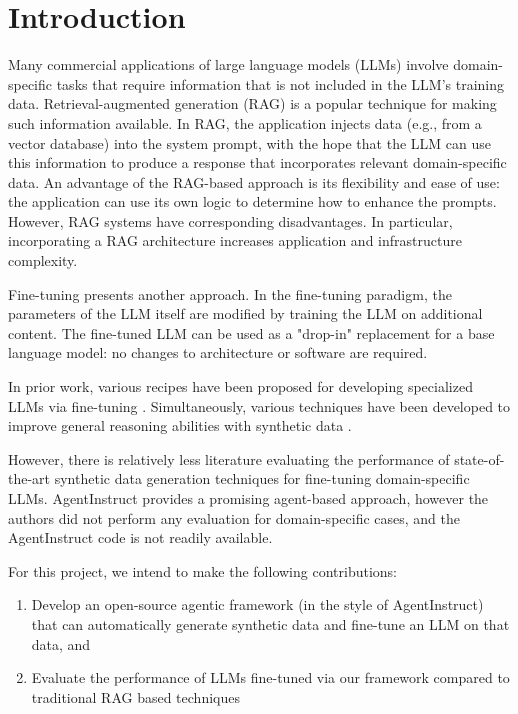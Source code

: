 \section{Introduction}
Many commercial applications of large language models (LLMs) involve
domain-specific tasks that require information that is not included in the LLM’s
training data. Retrieval-augmented generation (RAG)
\citep{lewis_retrieval-augmented_2020} is a popular technique for making such
information available. In RAG, the application injects data (e.g., from a
vector database) into the system prompt, with the hope that the LLM can use this
information to produce a response that incorporates relevant domain-specific
data. An advantage of the RAG-based approach is its flexibility and ease of use:
the application can use its own logic to determine how to enhance the prompts.
However, RAG systems have corresponding disadvantages. In particular,
incorporating a RAG architecture increases application and infrastructure
complexity.

Fine-tuning presents another approach. In the fine-tuning paradigm, the parameters of the LLM itself are modified by training the LLM on additional content. The fine-tuned LLM can be used as a "drop-in" replacement for a base language model: no changes to architecture or software are required.

In prior work, various recipes have been proposed for developing specialized LLMs via fine-tuning \citep{balaguer_rag_2024,yang_fingpt_2023,wu_pmc-llama_2023}. Simultaneously, various techniques have been developed to improve general reasoning abilities with synthetic data \citep{shao_synthetic_2023,wang_self-instruct_2023,mitra_agentinstruct_2024}.

However, there is relatively less literature evaluating the performance of
state-of-the-art synthetic data generation techniques for fine-tuning
domain-specific LLMs. AgentInstruct \citep{mitra_agentinstruct_2024} provides a promising
agent-based approach, however the authors did not perform any evaluation for
domain-specific cases, and the AgentInstruct code is not readily available.

For this project, we intend to make the following contributions:

\begin{enumerate}
\item Develop an open-source agentic framework (in the style of AgentInstruct)
that can automatically generate synthetic data and fine-tune an LLM on that
data, and
\item Evaluate the performance of LLMs fine-tuned via our framework compared to
traditional RAG based techniques
\end{enumerate}
